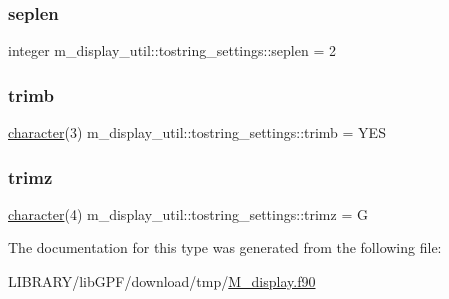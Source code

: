 \subsubsection{\texorpdfstring{seplen}{seplen}}
{\footnotesize\ttfamily integer m\+\_\+display\+\_\+util\+::tostring\+\_\+settings\+::seplen = 2\hspace{0.3cm}{\ttfamily [private]}}

\mbox{\label{structm__display__util_1_1tostring__settings_abe25da770037b27123ca85b581f08e30}} 
\subsubsection{\texorpdfstring{trimb}{trimb}}
{\footnotesize\ttfamily \hyperlink{option__stopwatch_83_8txt_abd4b21fbbd175834027b5224bfe97e66}{character}(3) m\+\_\+display\+\_\+util\+::tostring\+\_\+settings\+::trimb = \textquotesingle{}Y\+ES\textquotesingle{}\hspace{0.3cm}{\ttfamily [private]}}

\mbox{\label{structm__display__util_1_1tostring__settings_a3b37afe572f70b79ca2204ac5486ca7e}} 
\subsubsection{\texorpdfstring{trimz}{trimz}}
{\footnotesize\ttfamily \hyperlink{option__stopwatch_83_8txt_abd4b21fbbd175834027b5224bfe97e66}{character}(4) m\+\_\+display\+\_\+util\+::tostring\+\_\+settings\+::trimz = \textquotesingle{}G\textquotesingle{}\hspace{0.3cm}{\ttfamily [private]}}



The documentation for this type was generated from the following file\+:\begin{DoxyCompactItemize}
\item 
L\+I\+B\+R\+A\+R\+Y/lib\+G\+P\+F/download/tmp/\hyperlink{M__display_8f90}{M\+\_\+display.\+f90}\end{DoxyCompactItemize}
